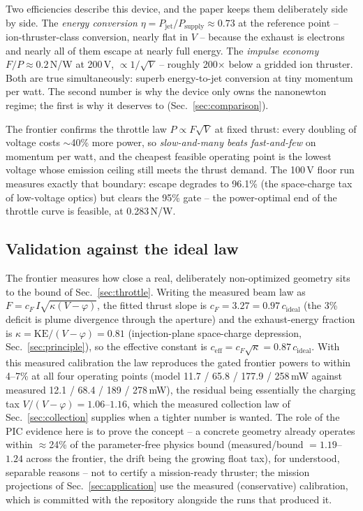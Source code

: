 \documentclass[11pt]{article}
\begin{document}
Two efficiencies describe this device, and the paper keeps them deliberately
side by side. The \emph{energy conversion}
$\eta = P_{\mathrm{jet}}/P_{\mathrm{supply}} \approx 0.73$ at the reference
point -- ion-thruster-class conversion, nearly flat in $V$ -- because the
exhaust is electrons and nearly all of them escape at nearly full energy.
The \emph{impulse economy} $F/P \approx 0.2$\,\textmu N/W at 200\,V,
$\propto 1/\sqrt{V}$ -- roughly 200$\times$ below a gridded ion thruster.
Both are true simultaneously: superb energy-to-jet conversion at tiny
momentum per watt. The second number is why the device only owns the
nanonewton regime; the first is why it deserves to
(Sec.~\ref{sec:comparison}).

The frontier confirms the throttle law $P \propto F\sqrt{V}$ at fixed
thrust: every doubling of voltage costs $\sim$40\% more power, so
\emph{slow-and-many beats fast-and-few} on momentum per watt, and the
cheapest feasible operating point is the lowest voltage whose emission
ceiling still meets the thrust demand. The 100\,V floor run measures
exactly that boundary: escape degrades to 96.1\% (the space-charge tax of
low-voltage optics) but clears the 95\% gate -- the power-optimal end of
the throttle curve is feasible, at 0.283\,\textmu N/W.

\subsection{Validation against the ideal law}
\label{sec:validation}
The frontier measures how close a real, deliberately non-optimized
geometry sits to the bound of Sec.~\ref{sec:throttle}. Writing the
measured beam law as
$F = c_F\, I \sqrt{\kappa(V-\varphi)}$, the fitted thrust slope is
$c_F = 3.27 = 0.97\,c_{\mathrm{ideal}}$ (the 3\% deficit is plume
divergence through the aperture) and the exhaust-energy fraction is
$\kappa = \mathrm{KE}/(V-\varphi) = 0.81$ (injection-plane space-charge
depression, Sec.~\ref{sec:principle}), so the effective constant is
$c_{\mathrm{eff}} = c_F\sqrt{\kappa} = 0.87\,c_{\mathrm{ideal}}$. With
this measured calibration the law reproduces the gated frontier powers to
within 4--7\% at all four operating points (model 11.7 / 65.8 /
177.9 / 258\,mW against measured 12.1 / 68.4 / 189 / 278\,mW), the
residual being
essentially the charging tax $V/(V-\varphi) = 1.06$--$1.16$, which the
measured collection law of Sec.~\ref{sec:collection} supplies when a
tighter number is wanted. The role of the PIC evidence here is to prove
the concept -- a concrete geometry already operates within
$\approx$24\% of the parameter-free physics bound (measured/bound
$= 1.19$--$1.24$ across the frontier, the drift being the growing float
tax), for understood, separable reasons
-- not to certify a mission-ready thruster; the mission
projections of Sec.~\ref{sec:application} use the measured (conservative)
calibration, which is committed with the repository alongside the runs
that produced it.
\end{document}
